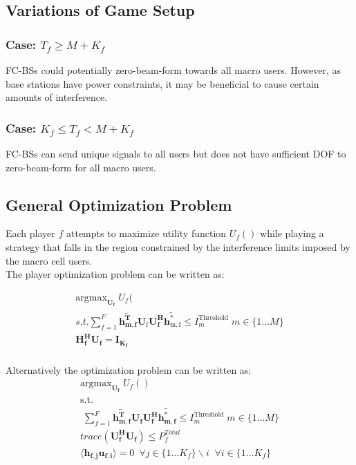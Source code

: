 \documentclass[12pt]{article}
\begin{document}
\subsection{Variations of Game Setup}

\subsubsection{Case: $T_f \geq M + K_f$}
FC-BSs could potentially zero-beam-form towards all macro users. However, as base stations have power constraints, it may be beneficial to cause certain amounts of interference. 

\subsubsection{Case: $K_f \leq T_f < M + K_f$}
FC-BSs can send unique signals to all users but does not have sufficient DOF to zero-beam-form for all macro users.


\subsection{General Optimization Problem}

Each player $f$ attempts to maximize utility function $U_f()$ while playing a strategy that falls in the region constrained by the interference limits imposed by the macro cell users.
\\

The player optimization problem can be written as:

\begin{gather*} 
\mathrm{argmax}_{\mathbf{U_f}} \; U_f(
\\
s.t. \sum^F_{f=1} \mathbf{\tilde{h_{m,f}^T}}  \mathbf{U_\mathrm{f}}  \mathbf{U_f^H} \mathbf{\tilde{h_{\mathrm{m,f}}^\mathrm{*}}} \leq I^{\mathrm{Threshold}}_{m}  \; m \in \{1 ... M\}
\\
\mathbf{H_f^H}\mathbf{U_f} = \mathbf{I_{K_f}}
\end{gather*}
\\

Alternatively the optimization problem can be written as:
\\

\begin{gather} 
\mathrm{argmax}_{\mathbf{U_f}} \; U_f()\label{utility}
\\
\mathrm{s.t.}
\\
\; \sum^F_{f=1} \mathbf{\tilde{h_{m,f}^T}}  \mathbf{U_f}  \mathbf{U_f^H} \mathbf{\tilde{h_{m,f}^*}} \leq I^{\mathrm{Threshold}}_{m} \; m \in \{1 ... M\} \label{interference_contstraint}
\\
trace(\mathbf{U_f^H}\mathbf{U_f}) \leq P^{Total}_{f} \label{power_constraint}
\\
\langle \mathbf{h_{f,j}}\mathbf{u_{f,i}} \rangle =0\ \; \forall j \in \{1 ... K_f\}\backslash i \;\; \forall i \in \{1 ... K_f\} \label{Zero_Forcing}
\end{gather}
\\
\end{document}
